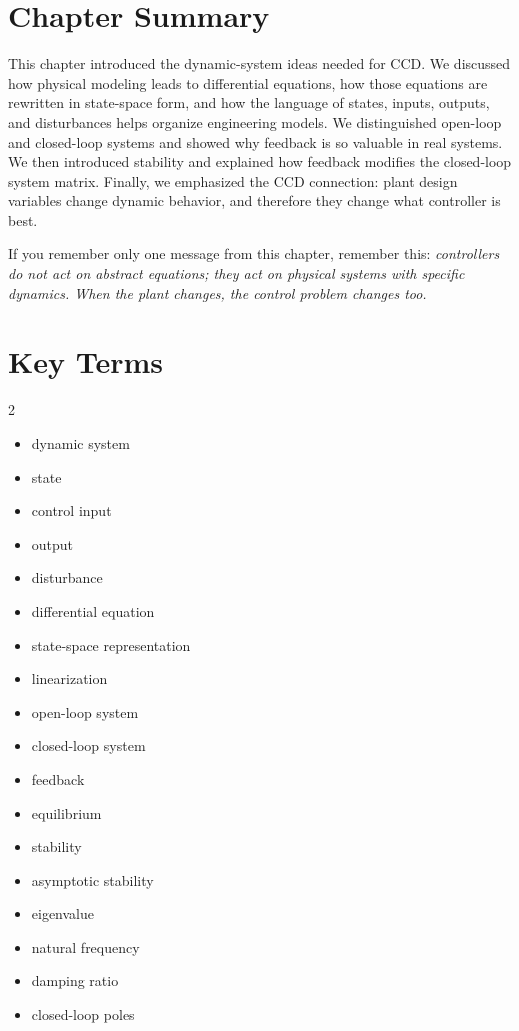 \documentclass[11pt]{article}
\begin{document}
\section{Chapter Summary}

This chapter introduced the dynamic-system ideas needed for CCD. We discussed how physical modeling leads to differential equations, how those equations are rewritten in state-space form, and how the language of states, inputs, outputs, and disturbances helps organize engineering models. We distinguished open-loop and closed-loop systems and showed why feedback is so valuable in real systems. We then introduced stability and explained how feedback modifies the closed-loop system matrix. Finally, we emphasized the CCD connection: plant design variables change dynamic behavior, and therefore they change what controller is best.

If you remember only one message from this chapter, remember this: \emph{controllers do not act on abstract equations; they act on physical systems with specific dynamics. When the plant changes, the control problem changes too.}

\section{Key Terms}

\begin{multicols}{2}
\begin{itemize}[leftmargin=1.4em,itemsep=0.25em]
  \item dynamic system
  \item state
  \item control input
  \item output
  \item disturbance
  \item differential equation
  \item state-space representation
  \item linearization
  \item open-loop system
  \item closed-loop system
  \item feedback
  \item equilibrium
  \item stability
  \item asymptotic stability
  \item eigenvalue
  \item natural frequency
  \item damping ratio
  \item closed-loop poles
\end{itemize}
\end{multicols}
\end{document}
